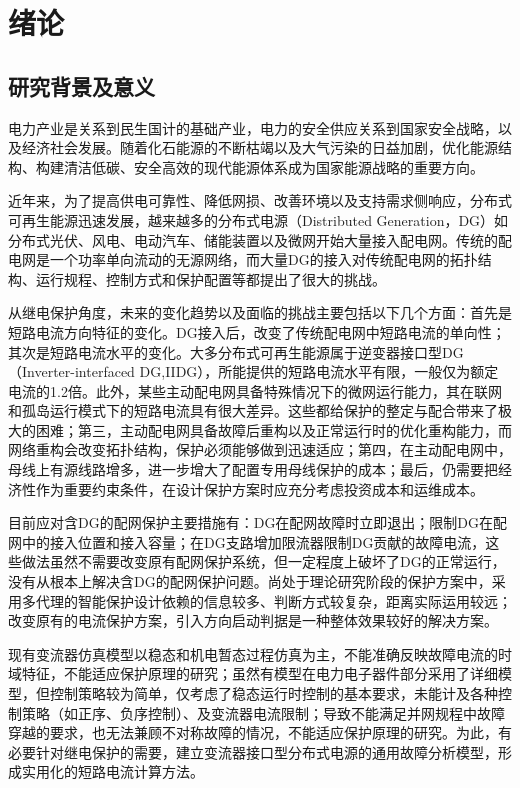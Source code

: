 \chapter{绪论}
\label{chap:introduction}

\section{研究背景及意义}

电力产业是关系到民生国计的基础产业，电力的安全供应关系到国家安全战略，以及经济社会发展。随着化石能源的不断枯竭以及大气污染的日益加剧，优化能源结构、构建清洁低碳、安全高效的现代能源体系成为国家能源战略的重要方向。

近年来，为了提高供电可靠性、降低网损、改善环境以及支持需求侧响应，分布式可再生能源迅速发展，越来越多的分布式电源（Distributed Generation，DG）如分布式光伏、风电、电动汽车、储能装置以及微网开始大量接入配电网。传统的配电网是一个功率单向流动的无源网络，而大量DG的接入对传统配电网的拓扑结构、运行规程、控制方式和保护配置等都提出了很大的挑战。

从继电保护角度，未来的变化趋势以及面临的挑战主要包括以下几个方面：首先是短路电流方向特征的变化。DG接入后，改变了传统配电网中短路电流的单向性；其次是短路电流水平的变化。大多分布式可再生能源属于逆变器接口型DG\cite{ustun2011central,naderi2016efficient}（Inverter-interfaced DG,IIDG），所能提供的短路电流水平有限，一般仅为额定电流的1.2倍。此外，某些主动配电网具备特殊情况下的微网运行能力，其在联网和孤岛运行模式下的短路电流具有很大差异。这些都给保护的整定与配合带来了极大的困难；第三，主动配电网具备故障后重构以及正常运行时的优化重构能力，而网络重构会改变拓扑结构，保护必须能够做到迅速适应；第四，在主动配电网中，母线上有源线路增多，进一步增大了配置专用母线保护的成本；最后，仍需要把经济性作为重要约束条件，在设计保护方案时应充分考虑投资成本和运维成本。

目前应对含DG的配网保护主要措施有：DG在配网故障时立即退出；限制DG在配网中的接入位置和接入容量；在DG支路增加限流器限制DG贡献的故障电流，这些做法虽然不需要改变原有配网保护系统，但一定程度上破坏了DG的正常运行，没有从根本上解决含DG的配网保护问题。尚处于理论研究阶段的保护方案中，采用多代理的智能保护设计依赖的信息较多、判断方式较复杂，距离实际运用较远；改变原有的电流保护方案，引入方向启动判据是一种整体效果较好的解决方案\cite{shangjin2013}。

现有变流器仿真模型以稳态和机电暂态过程仿真为主，不能准确反映故障电流的时域特征，不能适应保护原理的研究；虽然有模型在电力电子器件部分采用了详细模型，但控制策略较为简单，仅考虑了稳态运行时控制的基本要求，未能计及各种控制策略（如正序、负序控制）、及变流器电流限制；导致不能满足并网规程中故障穿越的要求，也无法兼顾不对称故障的情况，不能适应保护原理的研究。为此，有必要针对继电保护的需要，建立变流器接口型分布式电源的通用故障分析模型，形成实用化的短路电流计算方法。

